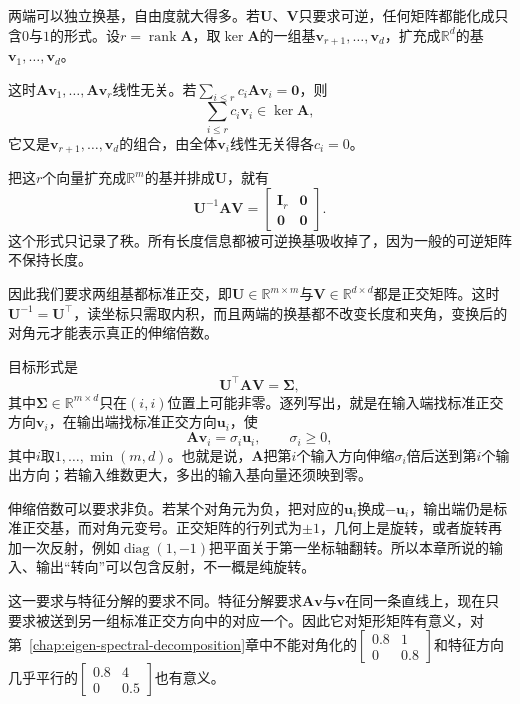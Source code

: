 两端可以独立换基，自由度就大得多。若$\bm U$、$\bm V$只要求可逆，任何矩阵都能化成只含$0$与$1$的形式。设$r=\operatorname{rank}\bm A$，取$\ker\bm A$的一组基$\bm v_{r+1},\ldots,\bm v_d$，扩充成$\mathbb R^d$的基$\bm v_1,\ldots,\bm v_d$。

这时$\bm A\bm v_1,\ldots,\bm A\bm v_r$线性无关。若$\sum_{i\leq r}c_i\bm A\bm v_i=\bm0$，则
\[
 \sum_{i\leq r}c_i\bm v_i\in\ker\bm A ,
\]
它又是$\bm v_{r+1},\ldots,\bm v_d$的组合，由全体$\bm v_i$线性无关得各$c_i=0$。

把这$r$个向量扩充成$\mathbb R^m$的基并排成$\bm U$，就有
\[
 \bm U^{-1}\bm A\bm V=\begin{bmatrix}\bm I_r&\bm0\\\bm0&\bm0\end{bmatrix}.
\]
这个形式只记录了秩。所有长度信息都被可逆换基吸收掉了，因为一般的可逆矩阵不保持长度。

因此我们要求两组基都标准正交，即$\bm U\in\mathbb R^{m\times m}$与$\bm V\in\mathbb R^{d\times d}$都是正交矩阵。这时$\bm U^{-1}=\bm U^\top$，读坐标只需取内积，而且两端的换基都不改变长度和夹角，变换后的对角元才能表示真正的伸缩倍数。

目标形式是
\[
 \bm U^\top\bm A\bm V=\bm\Sigma ,
\]
其中$\bm\Sigma\in\mathbb R^{m\times d}$只在$(i,i)$位置上可能非零。逐列写出，就是在输入端找标准正交方向$\bm v_i$，在输出端找标准正交方向$\bm u_i$，使
\[
 \bm A\bm v_i=\sigma_i\bm u_i,\qquad\sigma_i\geq0,
\]
其中$i$取$1,\ldots,\min(m,d)$。也就是说，$\bm A$把第$i$个输入方向伸缩$\sigma_i$倍后送到第$i$个输出方向；若输入维数更大，多出的输入基向量还须映到零。

伸缩倍数可以要求非负。若某个对角元为负，把对应的$\bm u_i$换成$-\bm u_i$，输出端仍是标准正交基，而对角元变号。正交矩阵的行列式为$\pm1$，几何上是旋转，或者旋转再加一次反射，例如$\operatorname{diag}(1,-1)$把平面关于第一坐标轴翻转。所以本章所说的输入、输出“转向”可以包含反射，不一概是纯旋转。

这一要求与特征分解的要求不同。特征分解要求$\bm A\bm v$与$\bm v$在同一条直线上，现在只要求被送到另一组标准正交方向中的对应一个。因此它对矩形矩阵有意义，对第~\ref{chap:eigen-spectral-decomposition}章中不能对角化的$\left[\begin{smallmatrix}0.8&1\\0&0.8\end{smallmatrix}\right]$和特征方向几乎平行的$\left[\begin{smallmatrix}0.8&4\\0&0.5\end{smallmatrix}\right]$也有意义。

